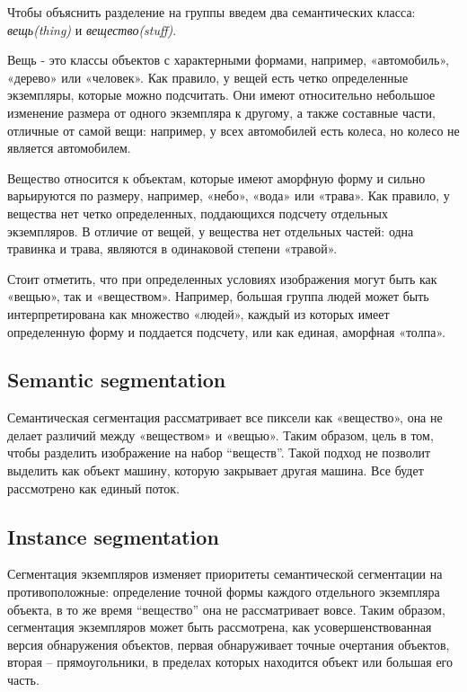 Чтобы объяснить разделение на группы введем два семантических класса: \textit{вещь(thing)} и \textit{вещество(stuff)}.

Вещь - это классы объектов с характерными формами, например, «автомобиль», «дерево» или «человек». Как правило, у вещей есть четко определенные экземпляры, которые можно подсчитать. Они имеют относительно небольшое изменение размера от одного экземпляра к другому, а также составные части, отличные от самой вещи: например, у всех автомобилей есть колеса, но колесо не является автомобилем.

Вещество относится к объектам, которые имеют аморфную форму и сильно варьируются по размеру, например, «небо», «вода» или «трава». Как правило, у вещества нет четко определенных, поддающихся подсчету отдельных экземпляров. В отличие от вещей, у вещества нет отдельных частей: одна травинка и трава, являются в одинаковой степени «травой».

Стоит отметить, что при определенных условиях изображения могут быть как «вещью», так и «веществом». Например, большая группа людей может быть интерпретирована как множество «людей», каждый из которых имеет определенную форму и поддается подсчету, или как единая, аморфная «толпа».

\subsection{Semantic segmentation}

Семантическая сегментация рассматривает все пиксели как «вещество», она не делает различий между «веществом» и «вещью». Таким образом, цель в том, чтобы разделить изображение на набор “веществ”. Такой подход не позволит выделить как объект машину, которую закрывает другая машина. Все будет рассмотрено как единый поток.

\subsection{Instance segmentation}

Сегментация экземпляров изменяет приоритеты семантической сегментации на противоположные: определение точной формы каждого отдельного экземпляра объекта, в то же время “вещество” она не рассматривает вовсе. Таким образом, сегментация экземпляров может быть рассмотрена, как усовершенствованная версия обнаружения объектов, первая обнаруживает точные очертания объектов, вторая – прямоугольники, в пределах которых находится объект или большая его часть.

